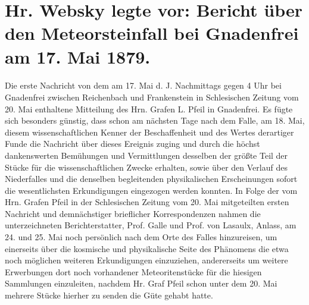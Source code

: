 \documentclass[a4paper, 11pt, oneside]{article}
\begin{document}
\section{Hr. Websky legte vor: Bericht über den Meteorsteinfall bei Gnadenfrei am 17. Mai 1879.}
\paragraph{}
Die erste Nachricht von dem am 17. Mai d. J. Nachmittags gegen 4 Uhr bei Gnadenfrei zwischen Reichenbach und Frankenstein in Schlesischen Zeitung vom 20. Mai enthaltene Mitteilung des Hrn. Grafen L. Pfeil in Gnadenfrei. Es fügte sich besonders günstig, dass schon am nächsten Tage nach dem Falle, am 18. Mai, diesem wissenschaftlichen Kenner der Beschaffenheit und des Wertes derartiger Funde die Nachricht über dieses Ereignis zuging und durch die höchst dankenswerten Bemühungen und Vermittlungen desselben der größte Teil der Stücke für die wissenschaftlichen Zwecke erhalten, sowie über den Verlauf des Niederfalles und die denselben begleitenden physikalischen Erscheinungen sofort die wesentlichsten Erkundigungen eingezogen werden konnten. In Folge der vom Hrn. Grafen Pfeil in der Schlesischen Zeitung vom 20. Mai mitgeteilten ersten Nachricht und demnächstiger brieflicher Korrespondenzen nahmen die unterzeichneten Berichterstatter, Prof. Galle und Prof. von Lasaulx, Anlass, am 24. und 25. Mai noch persönlich nach dem Orte des Falles hinzureisen, um einerseits über die kosmische und physikalische Seite des Phänomens die etwa noch möglichen weiteren Erkundigungen einzuziehen, andererseits um weitere Erwerbungen dort noch vorhandener Meteoritenstücke für die hiesigen Sammlungen einzuleiten, nachdem Hr. Graf Pfeil schon unter dem 20. Mai mehrere Stücke hierher zu senden die Güte gehabt hatte.
\end{document}
